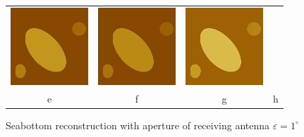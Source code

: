 \documentclass{procDDs}
\begin{document}
\begin{figure}[h!]
\begin{tabular}{cccc}
		\includegraphics[width=0.2\linewidth]{img/5/7.jpg}&
		\includegraphics[width=0.2\linewidth]{img/5/8.jpg}&
		\includegraphics[width=0.2\linewidth]{img/5/9.jpg}\\
		e & f & g & h		
	\end{tabular}
	\caption{Seabottom reconstruction with aperture of receiving antenna $\varepsilon=1^\circ$}
	\label{ris:desc1}
\end{figure}
\end{document}
